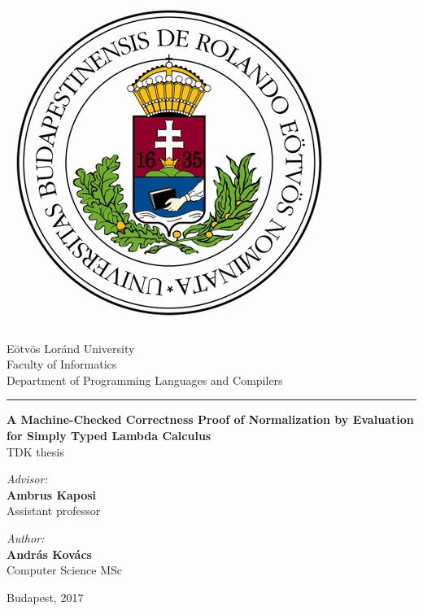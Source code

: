 \begin{titlepage}
\begin{minipage}{0.40\linewidth}
\includegraphics[scale=0.3]{elte-cimer}
\end{minipage}
\begin{minipage}{0.50\linewidth}
\begin{center}
Eötvös Loránd University \\
Faculty of Informatics \\
Department of Programming Languages and Compilers
\end{center}
\end{minipage}
\hrule
\vfill
\begin{center}
\Huge
\textbf{A Machine-Checked Correctness Proof of Normalization by Evaluation for Simply Typed Lambda Calculus}
\Large
\\
\vspace{2em}
TDK thesis
\normalsize
\end{center}
\vfill
\begin{minipage}[t]{0.5\linewidth}
\begin{flushleft}
\textit{Advisor:} \\
\textbf{Ambrus Kaposi} \\
Assistant professor
\end{flushleft}
\end{minipage}
\begin{minipage}[t]{0.5\linewidth}
\begin{flushright}
\textit{Author:} \\
\textbf{András Kovács} \\
Computer Science MSc
\end{flushright}
\end{minipage}
\vfill
\begin{center}
Budapest, 2017
\end{center}
\end{titlepage}
\cleardoublepage
{}
\setcounter{page}{1}
   
